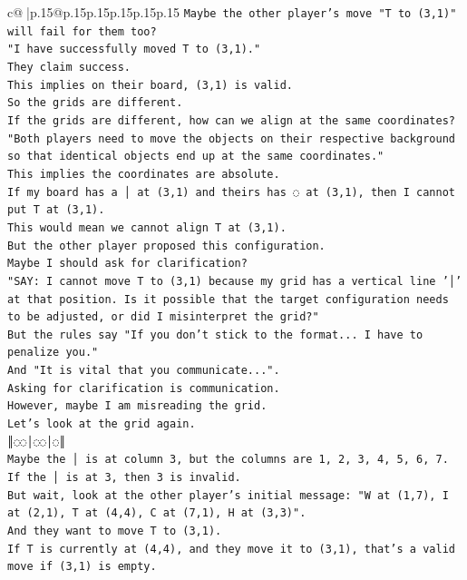 \documentclass{article}
\begin{document}
{\begin{supertabular}{c@{$\;$}|p{.15\linewidth}@{}p{.15\linewidth}p{.15\linewidth}p{.15\linewidth}p{.15\linewidth}p{.15\linewidth}}
{{{\texttt{Maybe the other player's move "T to (3,1)" will fail for them too?} \\
\texttt{"I have successfully moved T to (3,1)."} \\
\texttt{They claim success.} \\
\texttt{This implies on their board, (3,1) is valid.} \\
\texttt{So the grids are different.} \\
\texttt{If the grids are different, how can we align at the same coordinates?} \\
\texttt{"Both players need to move the objects on their respective background so that identical objects end up at the same coordinates."} \\
\texttt{This implies the coordinates are absolute.} \\
\texttt{If my board has a │ at (3,1) and theirs has ◌ at (3,1), then I cannot put T at (3,1).} \\
\texttt{This would mean we cannot align T at (3,1).} \\
\texttt{But the other player proposed this configuration.} \\
\texttt{Maybe I should ask for clarification?} \\
\texttt{"SAY: I cannot move T to (3,1) because my grid has a vertical line '│' at that position. Is it possible that the target configuration needs to be adjusted, or did I misinterpret the grid?"} \\
\texttt{But the rules say "If you don't stick to the format... I have to penalize you."} \\
\texttt{And "It is vital that you communicate...".} \\
\texttt{Asking for clarification is communication.} \\
\texttt{However, maybe I am misreading the grid.} \\
\texttt{Let's look at the grid again.} \\
\texttt{║◌◌│◌◌│◌║} \\
\texttt{Maybe the │ is at column 3, but the columns are 1, 2, 3, 4, 5, 6, 7.} \\
\texttt{If the │ is at 3, then 3 is invalid.} \\
\texttt{But wait, look at the other player's initial message: "W at (1,7), I at (2,1), T at (4,4), C at (7,1), H at (3,3)".} \\
\texttt{And they want to move T to (3,1).} \\
\texttt{If T is currently at (4,4), and they move it to (3,1), that's a valid move if (3,1) is empty.} \\
}}}
\end{supertabular}}
\end{document}
